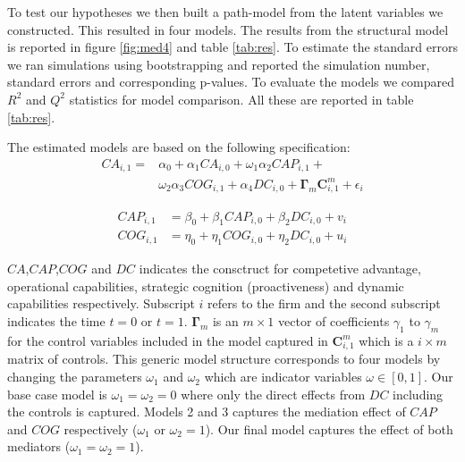 \documentclass[review,fleqn]{elsarticle}\usepackage[]{graphicx}\usepackage[]{color}
\begin{document}
To test our hypotheses we then built a path-model from the latent variables we
constructed. This resulted in four models. The results from the structural model is
reported in figure \ref{fig:med4} and table \ref{tab:res}. To estimate the standard errors
we ran simulations using bootstrapping and reported the simulation number, standard errors
and corresponding p-values. To evaluate the models we compared $R^2$ and $Q^2$ statistics
for model comparison. All these are reported in table \ref{tab:res}.


The estimated models are based on the following specification:
\begin{align}
  CA_{i,1}  = & \alpha_0 + \alpha_1 CA_{i,0} + \omega_1 \alpha_2 CAP_{i,1} + \\
           & \omega_2 \alpha_3 COG_{i,1} + \alpha_{4} DC_{i,0} + \mathbf{\Gamma}_m\mathbf{C}^m_{i,1} + \epsilon_i
\end{align}

\begin{align}
  CAP_{i,1} & = \beta_0 + \beta_1 CAP_{i,0} + \beta_2 DC_{i,0} + v_i\\
   COG_{i,1} & = \eta_0 + \eta_1 COG_{i,0} + \eta_2 DC_{i,0} +  u_i
\end{align}

$CA$,$CAP$,$COG$ and $DC$ indicates the consctruct for competetive advantage, operational
capabilities, strategic cognition (proactiveness) and dynamic capabilities
respectively. Subscript $i$ refers to the firm and the second subscript indicates the time
$t=0$ or $t=1$. $\mathbf{\Gamma}_m$ is an $m \times 1$ vector of coefficients $\gamma_1$
to $\gamma_m$ for the control variables included in the model captured in
$\mathbf{C}^m_{i,1}$ which is a $i \times m$ matrix of controls. This generic model
structure corresponds to four models by changing the parameters $\omega_1$ and $\omega_2$
which are indicator variables $\omega \in [0,1]$. Our base case model is
$\omega_1 = \omega_2 = 0$ where only the direct effects from $DC$ including the controls
is captured. Models 2 and 3 captures the mediation effect of $CAP$ and $COG$ respectively
($\omega_1$ or $\omega_2 = 1$). Our final model captures the effect of both mediators
($\omega_1 = \omega_2 = 1$).
\end{document}
